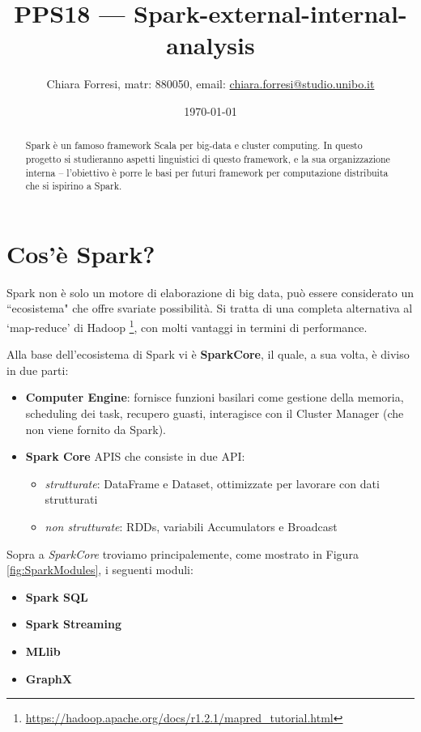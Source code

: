 \documentclass[12pt,italian]{article}
\title{PPS18  --- Spark-external-internal-analysis}
\author{Chiara Forresi, matr: 880050, email: {\url{chiara.forresi@studio.unibo.it}}}
\date{\today}
\begin{document}
\begin{titlingpage}
	\maketitle
	\begin{abstract}
		Spark è un famoso framework Scala per big-data e cluster computing. In questo progetto si studieranno aspetti linguistici di questo framework, e la sua organizzazione interna -- l'obiettivo è porre le basi per futuri framework per computazione distribuita che si ispirino a Spark.
	\end{abstract}
\end{titlingpage}
\nocite{*}
\tableofcontents
\newpage

\section{Cos'è Spark?}
Spark non è solo un motore di elaborazione di big data, può essere considerato un ``ecosistema" che offre svariate possibilità.
Si tratta di una completa alternativa al `map-reduce' di Hadoop \footnote{\url{https://hadoop.apache.org/docs/r1.2.1/mapred\_tutorial.html}}, con molti vantaggi in termini di performance. 
\par Alla base dell'ecosistema di Spark vi è \textbf{SparkCore}, il quale, a sua volta, è diviso in due parti:
\begin{itemize}
	\item \textbf{Computer Engine}: fornisce funzioni basilari come gestione della memoria, scheduling dei task, recupero guasti, interagisce con il Cluster Manager (che non viene fornito da Spark).
	\item \textbf{Spark Core} APIS che consiste in due API:
	\begin{itemize}
		\item \textit{strutturate}: DataFrame e Dataset, ottimizzate per lavorare con dati strutturati
		\item \textit{non strutturate}: RDDs, variabili Accumulators e Broadcast
	\end{itemize}
\end{itemize}
Sopra a \textit{SparkCore} troviamo principalemente, come mostrato in Figura \ref{fig:SparkModules}, i seguenti moduli:
\begin{itemize}
	\item \textbf{Spark SQL}
	\item  \textbf{Spark Streaming}
	\item \textbf{MLlib}
	\item \textbf{GraphX}
\end{itemize}
\end{document}
